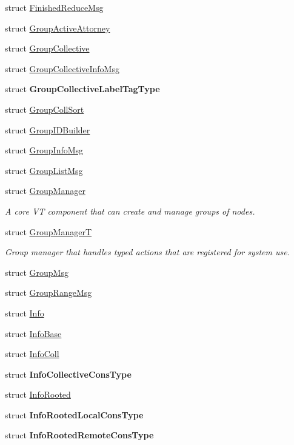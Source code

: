 \begin{DoxyCompactItemize}
\item 
struct \hyperlink{structvt_1_1group_1_1_finished_reduce_msg}{Finished\+Reduce\+Msg}
\item 
struct \hyperlink{structvt_1_1group_1_1_group_active_attorney}{Group\+Active\+Attorney}
\item 
struct \hyperlink{structvt_1_1group_1_1_group_collective}{Group\+Collective}
\item 
struct \hyperlink{structvt_1_1group_1_1_group_collective_info_msg}{Group\+Collective\+Info\+Msg}
\item 
struct {\bfseries Group\+Collective\+Label\+Tag\+Type}
\item 
struct \hyperlink{structvt_1_1group_1_1_group_coll_sort}{Group\+Coll\+Sort}
\item 
struct \hyperlink{structvt_1_1group_1_1_group_i_d_builder}{Group\+I\+D\+Builder}
\item 
struct \hyperlink{structvt_1_1group_1_1_group_info_msg}{Group\+Info\+Msg}
\item 
struct \hyperlink{structvt_1_1group_1_1_group_list_msg}{Group\+List\+Msg}
\item 
struct \hyperlink{structvt_1_1group_1_1_group_manager}{Group\+Manager}
\begin{DoxyCompactList}\small\item\em A core VT component that can create and manage groups of nodes. \end{DoxyCompactList}\item 
struct \hyperlink{structvt_1_1group_1_1_group_manager_t}{Group\+ManagerT}
\begin{DoxyCompactList}\small\item\em Group manager that handles typed actions that are registered for system use. \end{DoxyCompactList}\item 
struct \hyperlink{structvt_1_1group_1_1_group_msg}{Group\+Msg}
\item 
struct \hyperlink{structvt_1_1group_1_1_group_range_msg}{Group\+Range\+Msg}
\item 
struct \hyperlink{structvt_1_1group_1_1_info}{Info}
\item 
struct \hyperlink{structvt_1_1group_1_1_info_base}{Info\+Base}
\item 
struct \hyperlink{structvt_1_1group_1_1_info_coll}{Info\+Coll}
\item 
struct {\bfseries Info\+Collective\+Cons\+Type}
\item 
struct \hyperlink{structvt_1_1group_1_1_info_rooted}{Info\+Rooted}
\item 
struct {\bfseries Info\+Rooted\+Local\+Cons\+Type}
\item 
struct {\bfseries Info\+Rooted\+Remote\+Cons\+Type}
\end{DoxyCompactItemize}
